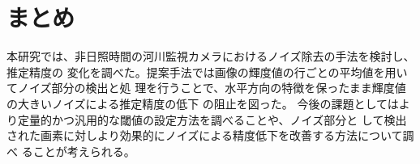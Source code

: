 \documentclass[10pt,a4j,twocolumn,oneside]{jsarticle}
\begin{document}
\section{まとめ}
本研究では、非日照時間の河川監視カメラにおけるノイズ除去の手法を検討し、推定精度の
変化を調べた。提案手法では画像の輝度値の行ごとの平均値を用いてノイズ部分の検出と処
理を行うことで、水平方向の特徴を保ったまま輝度値の大きいノイズによる推定精度の低下
の阻止を図った。
今後の課題としてはより定量的かつ汎用的な閾値の設定方法を調べることや、ノイズ部分と
して検出された画素に対しより効果的にノイズによる精度低下を改善する方法について調べ
ることが考えられる。




\end{document}
